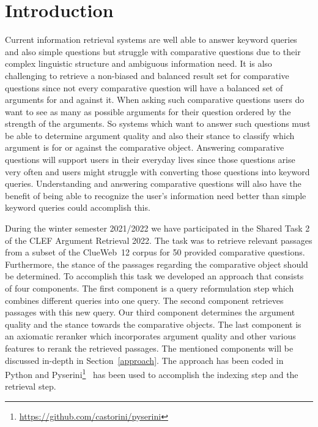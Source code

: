 \section{Introduction}\label{intro}

Current information retrieval systems are well able to answer keyword queries and also simple questions but struggle with comparative questions due to their complex linguistic structure and ambiguous information need.
It is also challenging to retrieve a non-biased and balanced result set for comparative questions since not every comparative question will have a balanced set of arguments for and against it.
When asking such comparative questions users do want to see as many as possible arguments for their question ordered by the strength of the arguments.
So systems which want to answer such questions must be able to determine argument quality and also their stance to classify which argument is for or against the comparative object.
Answering comparative questions will support users in their everyday lives since those questions arise very often and users might struggle with converting those questions into keyword queries.
Understanding and answering comparative questions will also have the benefit of being able to recognize the user's information need better than simple keyword queries could accomplish this. 

During the winter semester 2021/2022 we have participated in the Shared Task 2 of the CLEF Argument Retrieval 2022.
The task was to retrieve relevant passages from a subset of the ClueWeb~12 corpus for 50 provided comparative questions. Furthermore, the stance of the passages regarding the comparative object should be determined.
To accomplish this task we developed an approach that consists of four components.
The first component is a query reformulation step which combines different queries into one query.
The second component retrieves passages with this new query.
Our third component determines the argument quality and the stance towards the comparative objects.
The last component is an axiomatic reranker which incorporates argument quality and other various features to rerank the retrieved passages.
The mentioned components will be discussed in-depth in Section~\ref{approach}. The approach has been coded in Python and Pyserini\footnote{\url{https://github.com/castorini/pyserini}}~\cite{LinMLYPN2021} has been used to accomplish the indexing step and the retrieval step.

